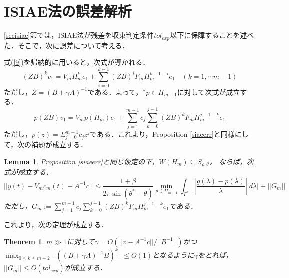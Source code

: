 \documentclass[a4paper,12pt]{nodlabpabw}
\newtheorem{thm}{Theorem}[chapter]
\newtheorem{lem}{Lemma}[chapter]
\begin{document}
\section{ISIAE法の誤差解析}
\ref{secisiae}節では，ISIAE法が残差を収束判定条件$tol_{exp}$以下に保障することを述べた．そこで，次に誤差について考える．

式(\ref{9})を帰納的に用いると，次式が導かれる．
\begin{equation}
(ZB)^kv_1=V_mH_m^ke_1+\sum_{i=0}^{k-1}(ZB)^{i}F_mH_m^{k-1-i}e_1\quad (k=1,\cdots m-1)\nonumber
\end{equation}
ただし，$Z=(B+\gamma A)^{-1}$である．よって，$^{\forall}p\in\Pi_{m-1}$に対して次式が成立する．
\begin{equation}
p(ZB)v_1=V_mp(H_m)e_1+\sum_{j=1}^{m-1}c_j\sum_{k=0}^{j-1}(ZB)^kF_mH_m^{j-1-k}e_1\nonumber
\end{equation}
ただし，$p(z)=\Sigma_{j=0}^{m-1}c_jz^j$である．これより，Proposition \ref{siaeerr}と同様にして，次の補題が成立する．
\begin{lem}
Proposition \ref{siaeerr}と同じ仮定の下，$W(H_m)\subseteq \overline{S_{\rho,\theta}}$，
ならば，次式が成立する．
$$||y(t)-V_mc_m(t)-A^{-1}c||\le \frac{1+\beta}{2\pi\sin(\theta^*-\theta)}\min_{p\in\Pi_{m-1}}\int_{\Gamma^*}\left|\frac{g(\lambda)-p(\lambda)}{\lambda}\right||d\lambda|+||G_m||$$
ただし，$G_m:=\sum_{j=1}^{m-1}c_j\sum_{k=0}^{j-1}(ZB)^kF_mH_m^{j-1-k}e_1$である．
\end{lem}
これより，次の定理が成立する．
\begin{thm}\label{themerr}
$m\gg 1$に対して$\gamma=O(||v-A^{-1}c||/||B^{-1}||)$かつ$\max_{0\le k\le m-2}||((B+\gamma A)^{-1}B)^k||\le O(1)$となるように$\gamma$をとれば，$||G_m||\le O(tol_{exp})$が成立する．
\end{thm}
\end{document}
